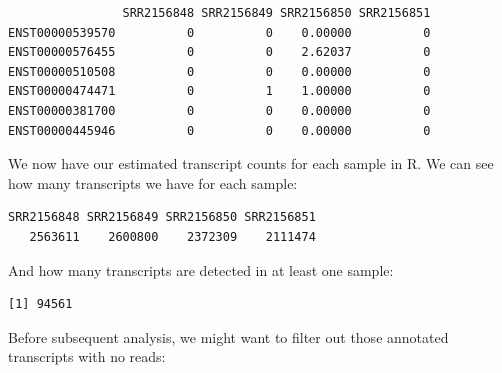 \documentclass[
  letterpaper,
  DIV=11,
  numbers=noendperiod]{scrartcl}
\newenvironment{Shaded}{\begin{snugshade}}{\end{snugshade}}
\newcommand{\DecValTok}[1]{\textcolor[rgb]{0.68,0.00,0.00}{#1}}
\newcommand{\FunctionTok}[1]{\textcolor[rgb]{0.28,0.35,0.67}{#1}}
\newcommand{\NormalTok}[1]{\textcolor[rgb]{0.00,0.23,0.31}{#1}}
\newcommand{\OtherTok}[1]{\textcolor[rgb]{0.00,0.23,0.31}{#1}}
\newcommand{\SpecialCharTok}[1]{\textcolor[rgb]{0.37,0.37,0.37}{#1}}
\begin{document}
\begin{verbatim}
                SRR2156848 SRR2156849 SRR2156850 SRR2156851
ENST00000539570          0          0    0.00000          0
ENST00000576455          0          0    2.62037          0
ENST00000510508          0          0    0.00000          0
ENST00000474471          0          1    1.00000          0
ENST00000381700          0          0    0.00000          0
ENST00000445946          0          0    0.00000          0
\end{verbatim}

We now have our estimated transcript counts for each sample in R. We can
see how many transcripts we have for each sample:

\begin{Shaded}
\end{Shaded}

\begin{verbatim}
SRR2156848 SRR2156849 SRR2156850 SRR2156851 
   2563611    2600800    2372309    2111474 
\end{verbatim}

And how many transcripts are detected in at least one sample:

\begin{Shaded}
\end{Shaded}

\begin{verbatim}
[1] 94561
\end{verbatim}

Before subsequent analysis, we might want to filter out those annotated
transcripts with no reads:

\begin{Shaded}
\end{Shaded}
\end{document}
